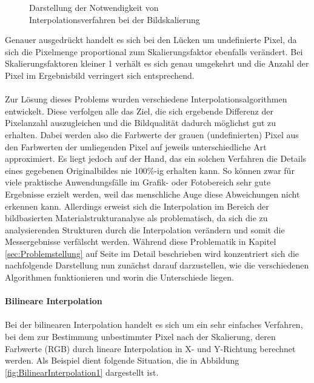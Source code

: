 \documentclass[
fontsize=10pt, 
listof = totoc,
parskip = half	
]{report}
\begin{document}
\begin{figure}[H]
	\caption{Darstellung der Notwendigkeit von\\ Interpolationsverfahren bei der Bildskalierung}
	\label{fig:ScalingProblem}
\end{figure}

\noindent Genauer ausgedrückt handelt es sich bei den Lücken um undefinierte Pixel, da sich die Pixelmenge proportional zum Skalierungsfaktor ebenfalls verändert. Bei Skalierungsfaktoren kleiner 1 verhält es sich genau umgekehrt und die Anzahl der Pixel im Ergebnisbild verringert sich entsprechend.
\\\\
\noindent Zur Lösung dieses Problems wurden verschiedene Interpolationsalgorithmen entwickelt. Diese verfolgen alle das Ziel, die sich ergebende Differenz der Pixelanzahl auszugleichen und die Bildqualität dadurch möglichst gut zu erhalten. Dabei werden also die Farbwerte der grauen (undefinierten) Pixel aus den Farbwerten der umliegenden Pixel auf jeweils unterschiedliche Art approximiert. Es liegt jedoch auf der Hand, das ein solchen Verfahren die Details eines gegebenen Originalbildes nie 100\%-ig erhalten kann. So können zwar für viele praktische Anwendungsfälle im Grafik- oder Fotobereich sehr gute Ergebnisse erzielt werden, weil das menschliche Auge diese Abweichungen nicht erkennen kann. Allerdings erweist sich die Interpolation im Bereich der bildbasierten Materialstrukturanalyse als problematisch, da sich  die zu analysierenden Strukturen durch die Interpolation verändern und somit die Messergebnisse verfälscht werden. Während diese Problematik in Kapitel \ref{sec:Problemstellung} auf Seite \pageref{sec:Problemstellung} im Detail beschrieben wird konzentriert sich die nachfolgende Darstellung nun zunächst darauf darzustellen, wie die verschiedenen Algorithmen funktionieren und worin die Unterschiede liegen.
\\\\
\textbf{Bilineare Interpolation}\label{par:LinearInterpol}
\\\\
Bei der bilinearen Interpolation handelt es sich um ein sehr einfaches Verfahren, bei dem zur Bestimmung unbestimmter Pixel nach der Skalierung, deren Farbwerte (RGB) durch lineare Interpolation in X- und Y-Richtung berechnet werden. Als Beispiel dient folgende Situation, die in Abbildung \ref{fig:BilinearInterpolation1} dargestellt ist.
\end{document}
